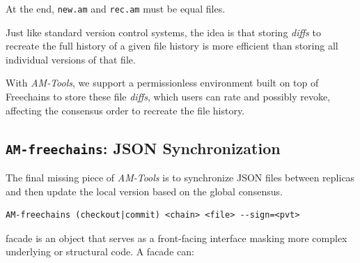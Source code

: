 \documentclass[12pt]{article}
\newcommand{\AMT}      {\emph{AM-Tools}\xspace}
\newcommand{\code}[1]  {\texttt{\footnotesize{#1}}}
\begin{document}
At the end, \code{new.am} and \code{rec.am} must be equal files.

Just like standard version control systems, the idea is that storing
\emph{diffs} to recreate the full history of a given file history is more
efficient than storing all individual versions of that file.

With \AMT, we support a permissionless environment built on top of Freechains
to store these file \emph{diffs}, which users can rate and possibly revoke,
affecting the consensus order to recreate the file history.

\subsection{\code{AM-freechains}: JSON Synchronization}

The final missing piece of \AMT is to synchronize JSON files between replicas
and then update the local version based on the global consensus.

\begin{verbatim}
AM-freechains (checkout|commit) <chain> <file> --sign=<pvt>
\end{verbatim}


facade is an object that serves as a front-facing interface masking more complex underlying or structural code. A facade can:



\end{document}
